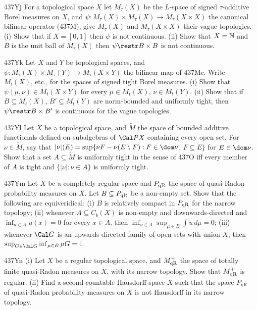 {\spheader 437Yj For a topological space $X$ let $M_{\tau}(X)$ be the
$L$-space of signed $\tau$-additive Borel measures on $X$, and
$\psi:M_{\tau}(X)\times M_{\tau}(X)\to M_{\tau}(X\times X)$ the
canonical bilinear operator (437M);  give $M_{\tau}(X)$ and
$M_{\tau}(X\times X)$ their vague topologies.   (i) Show that if
$X=[0,1]$ then $\psi$ is not continuous.   (ii) Show that $X=\Bbb N$ and
$B$ is the unit ball of $M_{\tau}(X)$ then $\psi\restr B\times B$ is not
continuous.

\spheader 437Yk Let $X$ and $Y$ be topological spaces, and
$\psi:M_{\tau}(X)\times M_{\tau}(Y)\to M_{\tau}(X\times Y)$ the bilinear
map of 437Mc.   Write $M_t(X)$, etc., for the spaces of signed tight
Borel measures.   (i) Show that $\psi(\mu,\nu)\in M_t(X\times Y)$ for
every $\mu\in M_t(X)$, $\nu\in M_t(Y)$.   (ii) Show that if
$B\subseteq M_t(X)$, $B'\subseteq M_t(Y)$ are norm-bounded and uniformly
tight, then $\psi\restr B\times B'$ is continuous for the vague
topologies.

\spheader 437Yl Let $X$ be a topological space, and
$\tilde M$ the
space of bounded additive functionals defined on subalgebras of $\Cal PX$
containing every open set.   For $\nu\in\tilde M$, say that
$|\nu|(E)=\sup\{\nu F-\nu(E\setminus F):F\in\dom\nu$, $F\subseteq E\}$ for
$E\in\dom\nu$.   Show that a set $A\subseteq\tilde M$ is uniformly tight
in the sense of 437O iff every member of $A$ is tight and
$\{|\nu|:\nu\in A\}$ is uniformly tight.

\spheader 437Ym Let $X$ be a completely regular space and
$P_{\text{qR}}$ the space of quasi-Radon probability measures on $X$.   Let
$B\subseteq P_{\text{qR}}$ be a non-empty set.   Show that the following are
equiveridical:  (i) $B$ is relatively compact in $P_{\text{qR}}$ for the
narrow topology;  (ii) whenever $A\subseteq C_b(X)$ is non-empty and
downwards-directed and $\inf_{u\in A}u(x)=0$ for every $x\in A$, then
$\inf_{u\in A}\sup_{\mu\in B}\int u\,d\mu=0$;  (iii) whenever $\Cal G$
is an upwards-directed family of open sets with union $X$, then
$\sup_{G\in\Cal G}\inf_{\mu\in B}\mu G=1$.

\spheader 437Yn (i) Let $X$ be a regular topological space,
and
$M^+_{\text{qR}}$ the space of totally finite quasi-Radon measures on $X$, with its
narrow topology.    Show that $M^+_{\text{qR}}$ is regular.   (ii)
Find a second-countable Hausdorff space $X$ such that the space
$P_{\text{qR}}$ of quasi-Radon probability measures on $X$ is not
Hausdorff in its narrow topology.

}
